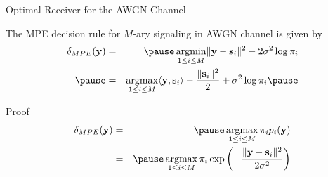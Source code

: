 \documentclass[t]{beamer}
\newcommand{\argmax}{\operatornamewithlimits{argmax}}
\newcommand{\argmin}{\operatornamewithlimits{argmin}}
\begin{document}
\begin{frame}{Optimal Receiver for the AWGN Channel}
  \footnotesize
  \begin{theorem}
    The MPE decision rule for $M$-ary signaling in AWGN channel is given by
      \begin{eqnarray*}
        \delta_{MPE}(\mathbf{y}) & = & \pause \argmin_{1 \leq i \leq M} \lVert \mathbf{y} - \mathbf{s}_i \rVert^2 - 2\sigma^2\log \pi_i \\
        \pause
                                 & = & \argmax_{1 \leq i \leq M} \langle \mathbf{y}, \mathbf{s}_i \rangle - \frac{\lVert \mathbf{s}_i \rVert^2}{2} +\sigma^2\log \pi_i 
        \pause
      \end{eqnarray*}
  \end{theorem}
  \begin{block}{Proof}
      \begin{eqnarray*}
        \delta_{MPE}(\mathbf{y}) & = & \pause \argmax_{1 \leq i \leq M} \pi_i p_i(\mathbf{y}) \\
                                 & = & \pause \argmax_{1 \leq i \leq M} \pi_i \exp\left( -\frac{\lVert \mathbf{y}-\mathbf{s}_i\rVert^2}{2\sigma^2}\right)
      \end{eqnarray*}
  \end{block}
  \normalsize
\end{frame}
\end{document}
